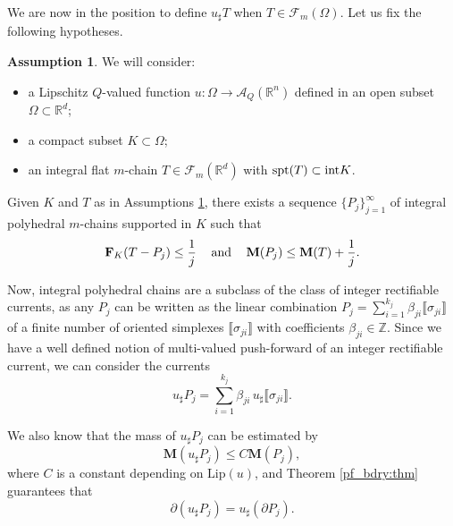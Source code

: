 \documentclass[a4paper,11pt,reqno]{amsart}
\theoremstyle{definition}
\newtheorem{ipotesi}[theorem]{Assumption}
\numberwithin{equation}{section}
\numberwithin{subsection}{section}
\newcommand{\Z}{\mathbb{Z}}
\newcommand{\R}{\mathbb{R}}
\newcommand{\A}{\mathcal{A}}
\newcommand{\M}{\mathbf{M}}
\newcommand{\Fl}{\mathbf{F}}
\newcommand{\F}{\mathscr{F}}
\newcommand{\Lip}{\mathrm{Lip}}
\newcommand{\spt}{\mathrm{spt}}
\begin{document}
We are now in the position to define $u_{\sharp}T$ when $T \in \F_{m}(\Omega)$. Let us fix the following hypotheses.

\begin{ipotesi} \label{hyp}
We will consider:
\begin{itemize}
\item a Lipschitz $Q$-valued function $u \colon \Omega \to \A_{Q}(\R^{n})$ defined in an open subset $\Omega \subset \R^{d}$;

\item a compact subset $K \subset \Omega$;

\item an integral flat $m$-chain $T \in \F_{m}(\R^{d})$ with $\spt(T) \subset {\rm int}K$.
\end{itemize}
\end{ipotesi}
 
Given $K$ and $T$ as in Assumptions \ref{hyp}, \cite[Theorem 4.2.22]{Federer69} there exists a sequence $\{ P_{j} \}_{j=1}^{\infty}$ of integral polyhedral $m$-chains supported in $K$ such that
\begin{equation} \label{pf_fc:1}
\Fl_{K}(T - P_{j}) \leq \frac{1}{j} \hspace{0.3cm} \mbox{ and } \hspace{0.3cm} \M(P_{j}) \leq \M(T) + \frac{1}{j}.
\end{equation} 

Now, integral polyhedral chains are a subclass of the class of integer rectifiable currents, as any $P_{j}$ can be written as the linear combination $P_{j} = \sum_{i=1}^{k_j} \beta_{ji} \llbracket \sigma_{ji} \rrbracket$ of a finite number of oriented simplexes $\llbracket \sigma_{ji} \rrbracket$ with coefficients $\beta_{ji} \in \Z$. Since we have a well defined notion of multi-valued push-forward of an integer rectifiable current, we can consider the currents
\begin{equation} \label{pf_fc:2}
u_{\sharp} P_{j} = \sum_{i=1}^{k_j} \beta_{ji} \, u_{\sharp} \llbracket \sigma_{ji} \rrbracket.
\end{equation}

We also know that the mass of $u_{\sharp}P_{j}$ can be estimated by
\begin{equation} \label{pf_fc:3}
\M(u_{\sharp}P_{j}) \leq C \M(P_{j}),
\end{equation}
where $C$ is a constant depending on $\Lip(u)$, and Theorem \ref{pf_bdry:thm} guarantees that
\begin{equation} \label{pf_fc:4}
\partial (u_{\sharp} P_{j}) = u_{\sharp} (\partial P_{j}).
\end{equation}
\end{document}
